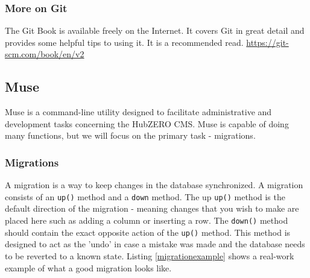 \documentclass[10pt,letterpaper,titlepage]{article}
\begin{document}
\subsubsection{More on Git}
The Git Book is available freely on the Internet. It covers Git in great detail and provides some helpful tips to using it. It is a recommended read.
\url{https://git-scm.com/book/en/v2}

\subsection{Muse}
\label{musereference}
Muse is a command-line utility designed to facilitate administrative and development tasks concerning the HubZERO CMS. Muse is capable of doing many functions, but we will focus on 
the primary task - migrations.

\subsubsection{Migrations}
A migration is a way to keep changes in the database synchronized. A migration consists of an \texttt{up()} method and a \texttt{down} method. The up \texttt{up()} method
is the default direction of the migration - meaning changes that you wish to make are placed here such as adding a column or inserting a row. The \texttt{down()} method should 
contain the exact opposite action of the \texttt{up()} method. This method is designed to act as the 'undo' in case a mistake was made and the database needs to be reverted to a known state. Listing
\ref{migrationexample} shows a real-work example of what a good migration looks like.
\end{document}
